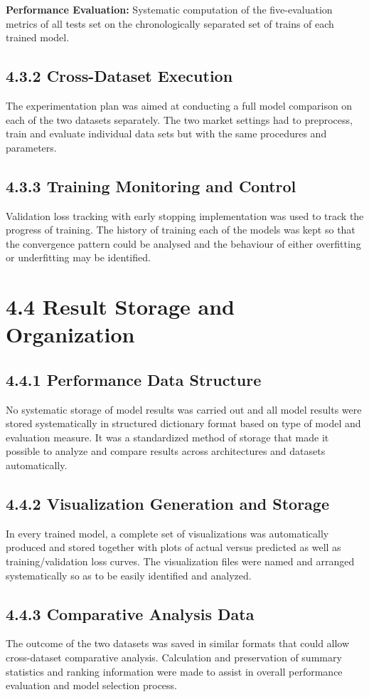\documentclass[12pt,a4paper]{report}
\begin{document}
\textbf{Performance Evaluation:} Systematic computation of the five-evaluation metrics of all tests set on the chronologically separated set of trains of each trained model.

\subsection{4.3.2 Cross-Dataset Execution}
The experimentation plan was aimed at conducting a full model comparison on each of the two datasets separately. The two market settings had to preprocess, train and evaluate individual data sets but with the same procedures and parameters.

\subsection{4.3.3 Training Monitoring and Control}
Validation loss tracking with early stopping implementation was used to track the progress of training. The history of training each of the models was kept so that the convergence pattern could be analysed and the behaviour of either overfitting or underfitting may be identified.

\section{4.4 Result Storage and Organization}
\subsection{4.4.1 Performance Data Structure}
No systematic storage of model results was carried out and all model results were stored systematically in structured dictionary format based on type of model and evaluation measure. It was a standardized method of storage that made it possible to analyze and compare results across architectures and datasets automatically.

\subsection{4.4.2 Visualization Generation and Storage}
In every trained model, a complete set of visualizations was automatically produced and stored together with plots of actual versus predicted as well as training/validation loss curves. The visualization files were named and arranged systematically so as to be easily identified and analyzed.

\subsection{4.4.3 Comparative Analysis Data}
The outcome of the two datasets was saved in similar formats that could allow cross-dataset comparative analysis. Calculation and preservation of summary statistics and ranking information were made to assist in overall performance evaluation and model selection process.
\end{document}
